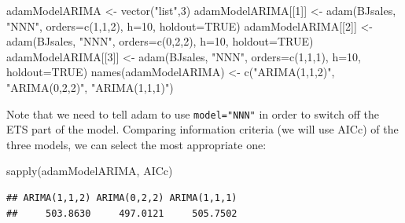 \documentclass[
]{book}
\newenvironment{Shaded}{\begin{snugshade}}{\end{snugshade}}
\newcommand{\AttributeTok}[1]{\textcolor[rgb]{0.77,0.63,0.00}{#1}}
\newcommand{\ConstantTok}[1]{\textcolor[rgb]{0.00,0.00,0.00}{#1}}
\newcommand{\DecValTok}[1]{\textcolor[rgb]{0.00,0.00,0.81}{#1}}
\newcommand{\FunctionTok}[1]{\textcolor[rgb]{0.00,0.00,0.00}{#1}}
\newcommand{\NormalTok}[1]{#1}
\newcommand{\OtherTok}[1]{\textcolor[rgb]{0.56,0.35,0.01}{#1}}
\newcommand{\StringTok}[1]{\textcolor[rgb]{0.31,0.60,0.02}{#1}}
\theoremstyle{definition}
\theoremstyle{definition}
\theoremstyle{definition}
\theoremstyle{definition}
\theoremstyle{remark}
\begin{document}
\begin{Shaded}
\begin{Highlighting}[]
\NormalTok{adamModelARIMA }\OtherTok{\textless{}{-}} \FunctionTok{vector}\NormalTok{(}\StringTok{"list"}\NormalTok{,}\DecValTok{3}\NormalTok{)}
\NormalTok{adamModelARIMA[[}\DecValTok{1}\NormalTok{]] }\OtherTok{\textless{}{-}} \FunctionTok{adam}\NormalTok{(BJsales, }\StringTok{"NNN"}\NormalTok{, }\AttributeTok{orders=}\FunctionTok{c}\NormalTok{(}\DecValTok{1}\NormalTok{,}\DecValTok{1}\NormalTok{,}\DecValTok{2}\NormalTok{),}
                            \AttributeTok{h=}\DecValTok{10}\NormalTok{, }\AttributeTok{holdout=}\ConstantTok{TRUE}\NormalTok{)}
\NormalTok{adamModelARIMA[[}\DecValTok{2}\NormalTok{]] }\OtherTok{\textless{}{-}} \FunctionTok{adam}\NormalTok{(BJsales, }\StringTok{"NNN"}\NormalTok{, }\AttributeTok{orders=}\FunctionTok{c}\NormalTok{(}\DecValTok{0}\NormalTok{,}\DecValTok{2}\NormalTok{,}\DecValTok{2}\NormalTok{),}
                            \AttributeTok{h=}\DecValTok{10}\NormalTok{, }\AttributeTok{holdout=}\ConstantTok{TRUE}\NormalTok{)}
\NormalTok{adamModelARIMA[[}\DecValTok{3}\NormalTok{]] }\OtherTok{\textless{}{-}} \FunctionTok{adam}\NormalTok{(BJsales, }\StringTok{"NNN"}\NormalTok{, }\AttributeTok{orders=}\FunctionTok{c}\NormalTok{(}\DecValTok{1}\NormalTok{,}\DecValTok{1}\NormalTok{,}\DecValTok{1}\NormalTok{),}
                            \AttributeTok{h=}\DecValTok{10}\NormalTok{, }\AttributeTok{holdout=}\ConstantTok{TRUE}\NormalTok{)}
\FunctionTok{names}\NormalTok{(adamModelARIMA) }\OtherTok{\textless{}{-}} \FunctionTok{c}\NormalTok{(}\StringTok{"ARIMA(1,1,2)"}\NormalTok{, }\StringTok{"ARIMA(0,2,2)"}\NormalTok{,}
                           \StringTok{"ARIMA(1,1,1)"}\NormalTok{)}
\end{Highlighting}
\end{Shaded}

Note that we need to tell adam to use \texttt{model="NNN"} in order to switch off the ETS part of the model. Comparing information criteria (we will use AICc) of the three models, we can select the most appropriate one:

\begin{Shaded}
\begin{Highlighting}[]
\FunctionTok{sapply}\NormalTok{(adamModelARIMA, AICc)}
\end{Highlighting}
\end{Shaded}

\begin{verbatim}
## ARIMA(1,1,2) ARIMA(0,2,2) ARIMA(1,1,1) 
##     503.8630     497.0121     505.7502
\end{verbatim}
\end{document}
